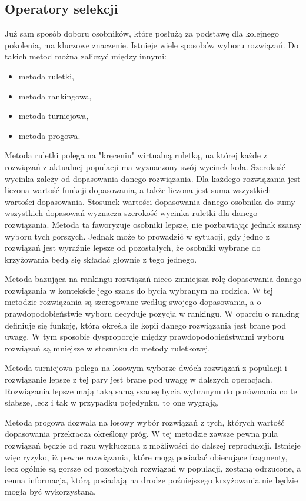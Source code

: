 \subsection{Operatory selekcji}
Już sam sposób doboru osobników, które posłużą za podstawę dla kolejnego pokolenia, ma kluczowe znaczenie. Istnieje wiele sposobów wyboru rozwiązań. Do takich metod można zaliczyć między innymi:
\begin{itemize}
\item metoda ruletki,
\item metoda rankingowa,
\item metoda turniejowa,
\item metoda progowa.
\end{itemize}

Metoda ruletki polega na "kręceniu" wirtualną ruletką, na której każde z rozwiązań z aktualnej populacji ma wyznaczony swój wycinek koła. Szerokość wycinka zależy od dopasowania danego rozwiązania. Dla każdego rozwiązania jest liczona wartość funkcji dopasowania, a także liczona jest suma wszystkich wartości dopasowania. Stosunek wartości dopasowania danego osobnika do sumy wszystkich dopasowań wyznacza szerokość wycinka ruletki dla danego rozwiązania. Metoda ta faworyzuje osobniki lepsze, nie pozbawiając jednak szansy wyboru tych gorszych. Jednak może to prowadzić w sytuacji, gdy jedno z rozwiązań jest wyraźnie lepsze od pozostałych, że osobniki wybrane do krzyżowania będą się składać głownie z tego jednego.

Metoda bazująca na rankingu rozwiązań nieco zmniejsza rolę dopasowania danego rozwiązania w kontekście jego szans do bycia wybranym na rodzica. W tej metodzie rozwiązania są szeregowane według swojego dopasowania, a o prawdopodobieństwie wyboru decyduje pozycja w rankingu. W oparciu o ranking definiuje się funkcję, która określa ile kopii danego rozwiązania jest brane pod uwagę. W tym sposobie dysproporcje między prawdopodobieństwami wyboru rozwiązań są mniejsze w stosunku do metody ruletkowej.

Metoda turniejowa polega na losowym wyborze dwóch rozwiązań z populacji i rozwiązanie lepsze z tej pary jest brane pod uwagę w dalszych operacjach. Rozwiązania lepsze mają taką samą szansę bycia wybranym do porównania co te słabsze, lecz i tak w przypadku pojedynku, to one wygrają.

Metoda progowa dozwala na losowy wybór rozwiązań z tych, których wartość dopasowania przekracza określony próg. W tej metodzie zawsze pewna pula rozwiązań będzie od razu wykluczona z możliwości do dalszej reprodukcji. Istnieje więc ryzyko, iż pewne rozwiązania, które mogą posiadać obiecujące fragmenty, lecz ogólnie są gorsze od pozostałych rozwiązań w populacji, zostaną odrzucone, a cenna informacja, którą posiadają na drodze poźniejszego krzyżowania nie będzie mogła być wykorzystana.

